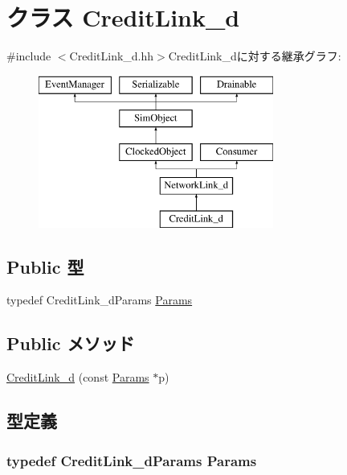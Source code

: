 \hypertarget{classCreditLink__d}{
\section{クラス CreditLink\_\-d}
\label{classCreditLink__d}
}


{\ttfamily \#include $<$CreditLink\_\-d.hh$>$}CreditLink\_\-dに対する継承グラフ:\begin{figure}[H]
\begin{center}
\leavevmode
\includegraphics[height=5cm]{classCreditLink__d}
\end{center}
\end{figure}
\subsection*{Public 型}
\begin{DoxyCompactItemize}
\item 
typedef CreditLink\_\-dParams \hyperlink{classCreditLink__d_a5869b5dc6fac750f04b868a201484100}{Params}
\end{DoxyCompactItemize}
\subsection*{Public メソッド}
\begin{DoxyCompactItemize}
\item 
\hyperlink{classCreditLink__d_a8d903e92b8ca522f0ba6448df824989b}{CreditLink\_\-d} (const \hyperlink{classCreditLink__d_a5869b5dc6fac750f04b868a201484100}{Params} $\ast$p)
\end{DoxyCompactItemize}


\subsection{型定義}
\hypertarget{classCreditLink__d_a5869b5dc6fac750f04b868a201484100}{
\subsubsection[{Params}]{\setlength{\rightskip}{0pt plus 5cm}typedef CreditLink\_\-dParams {\bf Params}}}
\label{classCreditLink__d_a5869b5dc6fac750f04b868a201484100}


